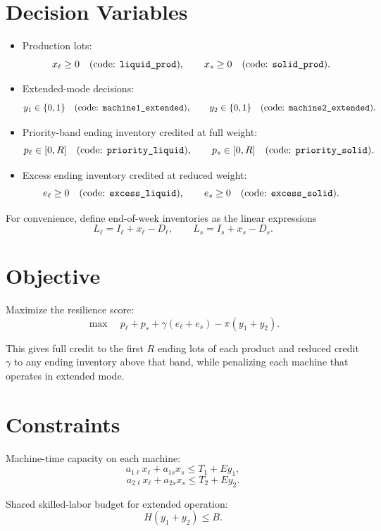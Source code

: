 \section*{Decision Variables}

\begin{itemize}
    \item Production lots:
    \[
    x_\ell \ge 0 \quad \text{(code: \texttt{liquid\_prod})},\qquad
    x_s \ge 0 \quad \text{(code: \texttt{solid\_prod})}.
    \]
    \item Extended-mode decisions:
    \[
    y_1 \in \{0,1\} \quad \text{(code: \texttt{machine1\_extended})},\qquad
    y_2 \in \{0,1\} \quad \text{(code: \texttt{machine2\_extended})}.
    \]
    \item Priority-band ending inventory credited at full weight:
    \[
    p_\ell \in [0,R] \quad \text{(code: \texttt{priority\_liquid})},\qquad
    p_s \in [0,R] \quad \text{(code: \texttt{priority\_solid})}.
    \]
    \item Excess ending inventory credited at reduced weight:
    \[
    e_\ell \ge 0 \quad \text{(code: \texttt{excess\_liquid})},\qquad
    e_s \ge 0 \quad \text{(code: \texttt{excess\_solid})}.
    \]
\end{itemize}

For convenience, define end-of-week inventories as the linear expressions
\[
L_\ell = I_\ell + x_\ell - D_\ell,\qquad
L_s = I_s + x_s - D_s.
\]

\section*{Objective}

Maximize the resilience score:
\[
\max \quad p_\ell + p_s + \gamma(e_\ell+e_s) - \pi(y_1+y_2).
\]

This gives full credit to the first $R$ ending lots of each product and reduced credit $\gamma$ to any ending inventory above that band, while penalizing each machine that operates in extended mode.

\section*{Constraints}

Machine-time capacity on each machine:
\[
a_{1\ell}x_\ell + a_{1s}x_s \le T_1 + Ey_1,
\]
\[
a_{2\ell}x_\ell + a_{2s}x_s \le T_2 + Ey_2.
\]

Shared skilled-labor budget for extended operation:
\[
H(y_1+y_2) \le B.
\]

